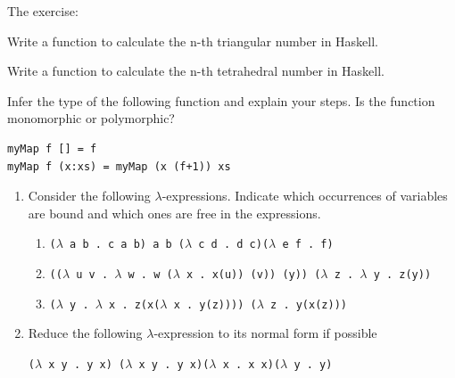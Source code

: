 \documentclass [11pt, a4wide, twoside]{article}
\begin{document}
\noindent The exercise:
\begin{myenumerate}
\item Write a function to calculate the n-th triangular number in Haskell.

\vspace{4cm}

\item Write a function to calculate the n-th tetrahedral number in Haskell.

\vspace{4cm}


\item Infer the type of the following function and explain your steps. Is the function monomorphic or polymorphic? 
\begin{small}
\begin{verbatim}
myMap f [] = f
myMap f (x:xs) = myMap (x (f+1)) xs
\end{verbatim}
\end{small}

\end{myenumerate}
\solution{}

\newpage

\noindent
%
\begin{enumerate}
\item Consider the following $\lambda$-expressions. Indicate which occurrences of
variables are bound and which ones are free in the expressions.

\begin{enumerate}
\item \texttt{($\lambda$ a b .~c a b) a b ($\lambda$ c d .~d c)($\lambda$ e f .~f) } \vspace{1cm}

\item \texttt{(($\lambda$ u v .~$\lambda$ w .~w ($\lambda$ x .~x(u)) (v)) (y)) ($\lambda$ z .~$\lambda$ y .~z(y))}\vspace{1cm}

\item \texttt{($\lambda$ y .~$\lambda$ x .~z(x($\lambda$ x .~y(z)))) ($\lambda$ z .~y(x(z)))}\vspace{1cm}
\end{enumerate}
\item Reduce the following $\lambda$-expression to its normal form if possible 

\texttt{($\lambda$ x y .~y x) ($\lambda$ x y .~y x)($\lambda$ x .~x x)($\lambda$ y .~y)} 
\end{enumerate}
\solution{\fontsize{9pt}{11pt}}
\end{document}
